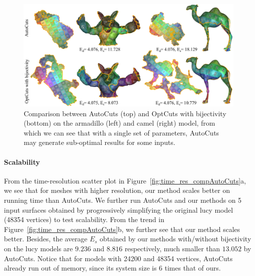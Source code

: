 \begin{figure}[!h]
\centering
\includegraphics[width=\linewidth]{fig/comp_AutoCuts.png}
\caption{Comparison between AutoCuts (top) and OptCuts with bijectivity (bottom) on the armadillo (left) and camel (right) model, from which we can see that with a single set of parameters, AutoCuts may generate sub-optimal results for some inputs.}
\label{fig:comp_AutoCuts}
\end{figure}

\paragraph{Scalability}
From the time-resolution scatter plot in Figure~\ref{fig:time_res_compAutoCuts}a, we see that for meshes with higher resolution, our method scales better on running time than AutoCuts.
We further run AutoCuts and our methods on 5 input surfaces obtained by progressively simplifying the original lucy model (48354 vertices) to test scalability. From the trend in Figure~\ref{fig:time_res_compAutoCuts}b, we further see that our method scales better. Besides, the average $E_{s}$ obtained by our methods with/without bijectivity on the lucy models are $9.236$ and $8.816$ respectively, much smaller than $13.052$ by AutoCuts. Notice that for models with 24200 and 48354 vertices, AutoCuts already run out of memory, since its system size is $6$ times that of ours.

